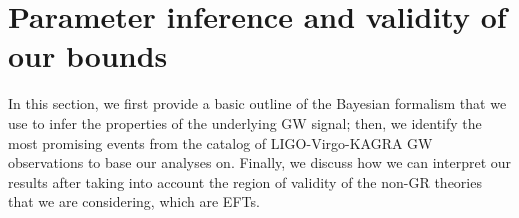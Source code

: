 \documentclass[twocolumn,
               prd,
               aps,
               superscriptaddress,
               tightenlines,
               nofootinbib,
               eqsecnum,
               amsfonts,
               amsmath,
               longbibliography]{revtex4-1}
\begin{document}

\section{Parameter inference and validity of our bounds}
\label{sec:pe}

In this section, we first provide a basic outline of the Bayesian formalism that we use to
infer the properties of the underlying GW signal; then, we identify the most promising
events from the catalog of LIGO-Virgo-KAGRA GW observations to base our analyses on. Finally,
we discuss how we can interpret our results after taking into account the region of validity of
the non-GR theories that we are considering, which are EFTs.
\end{document}
